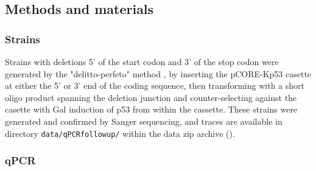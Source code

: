 \subsection{Methods and materials}

\subsubsection{Strains}

Strains with deletions 5' of the start codon and 3' of the stop
codon were generated by the "delitto-perfeto" 
method \parencite{storici2006delitto}, 
by inserting the pCORE-Kp53 casette
at either the 5' or 3' end of the coding sequence, then transforming
with a short oligo product spanning the deletion junction and
counter-selecting against the casette with Gal induction of p53 
from within the cassette.
These strains were generated and confirmed by Sanger sequencing,
and traces are available in directory \texttt{data/qPCRfollowup/} 
within the data zip archive ().

\subsubsection{qPCR}

